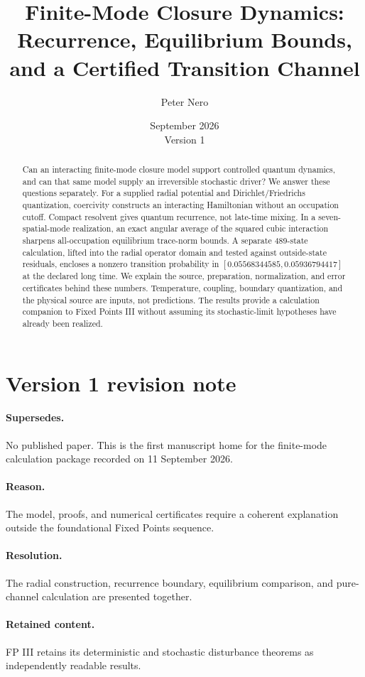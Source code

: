 \documentclass[11pt]{article}
\title{Finite-Mode Closure Dynamics:\\Recurrence, Equilibrium Bounds,\\and a Certified Transition Channel}
\author{Peter Nero}
\date{September 2026\\Version 1}
\begin{document}
\maketitle
\begin{abstract}
Can an interacting finite-mode closure model support controlled quantum
dynamics, and can that same model supply an irreversible stochastic driver?
We answer these questions separately. For a supplied radial potential and
Dirichlet/Friedrichs quantization, coercivity constructs an interacting
Hamiltonian without an occupation cutoff. Compact resolvent gives quantum
recurrence, not late-time mixing. In a seven-spatial-mode realization, an
exact angular average of the squared cubic interaction sharpens
all-occupation equilibrium trace-norm bounds. A separate 489-state
calculation, lifted into the radial operator domain and tested against
outside-state residuals, encloses a nonzero transition probability in
$[0.05568344585,0.05936794417]$ at the declared long time. We explain the
source, preparation, normalization, and error certificates behind these
numbers. Temperature, coupling, boundary quantization, and the physical
source are inputs, not predictions. The results provide a calculation
companion to Fixed Points III without assuming its stochastic-limit
hypotheses have already been realized.
\end{abstract}

\section*{Version 1 revision note}
\paragraph{Supersedes.} No published paper. This is the first manuscript home
for the finite-mode calculation package recorded on 11 September 2026.
\paragraph{Reason.} The model, proofs, and numerical certificates require a
coherent explanation outside the foundational Fixed Points sequence.
\paragraph{Resolution.} The radial construction, recurrence boundary,
equilibrium comparison, and pure-channel calculation are presented together.
\paragraph{Retained content.} FP III retains its deterministic and stochastic
disturbance theorems as independently readable results.
\end{document}
